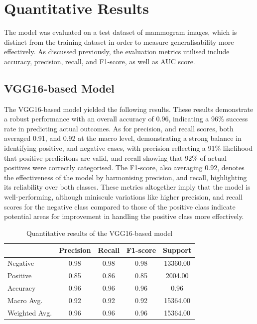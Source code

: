 \documentclass[../main]{subfiles}
\begin{document}
\section{Quantitative Results}
\label{sec:quantitative-results}
The model was evaluated on a test dataset of mammogram images, which is distinct from the training dataset in order to measure generalisability more effectively. As discussed previously, the evaluation metrics utilised include accuracy, precision, recall, and F1-score, as well as AUC score.

\subsection{VGG16-based Model}
The VGG16-based model yielded the following results. These results demonstrate a robust performance with an overall accuracy of 0.96, indicating a 96\% success rate in predicting actual outcomes. As for precision, and recall scores, both averaged 0.91, and 0.92 at the macro level, demonstrating a strong balance in identifying positive, and negative cases, with precision reflecting a 91\% likelihood that positive predicitons are valid, and recall showing that 92\% of actual positives were correctly categorised. The F1-score, also averaging 0.92, denotes the effectiveness of the model by harmonising precision, and recall, highlighting its reliability over both classes. These metrics altogether imply that the model is well-performing, although miniscule variations like higher precision, and recall scores for the negative class compared to those of the positive class indicate potential areas for improvement in handling the positive class more effectively.

\begin{table}[h]
    \centering
    \begin{tabular}{|l|c|c|c|c|}
        \hline
         & Precision & Recall & F1-score & Support \\ \hline
        Negative & 0.98 & 0.98 & 0.98 & 13360.00 \\ \hline
        Positive & 0.85 & 0.86 & 0.85 & 2004.00 \\ \hline
        Accuracy & 0.96 & 0.96 & 0.96 & 0.96 \\ \hline
        Macro Avg. & 0.92 & 0.92 & 0.92 & 15364.00 \\ \hline
        Weighted Avg. & 0.96 & 0.96 & 0.96 & 15364.00 \\ \hline
    \end{tabular}
    \caption{Quantitative results of the VGG16-based model}
    \label{tab:quantitative-results-vgg16}
\end{table}
\end{document}
